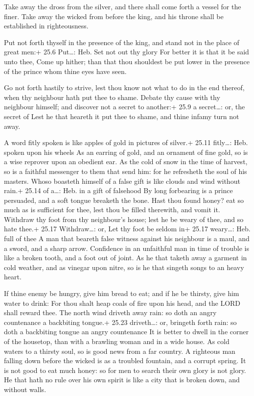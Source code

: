  Take away the dross from the silver, and there shall come
forth a vessel for the finer.  Take away the wicked from
before the king, and his throne shall be established in righteousness.

 Put not forth thyself in the presence of the king, and
stand not in the place of great men:+ 25.6 Put\ldots: Heb. Set not out
thy glory  For better it is that it be said unto thee, Come
up hither; than that thou shouldest be put lower in the presence of the
prince whom thine eyes have seen.

 Go not forth hastily to strive, lest thou know not what to
do in the end thereof, when thy neighbour hath put thee to shame.
 Debate thy cause with thy neighbour himself; and discover
not a secret to another:+ 25.9 a secret\ldots: or, the secret of
 Lest he that heareth it put thee to shame, and thine
infamy turn not away.

 A word fitly spoken is like apples of gold in pictures of
silver.+ 25.11 fitly\ldots: Heb. spoken upon his wheels  As
an earring of gold, and an ornament of fine gold, so is a wise reprover
upon an obedient ear.  As the cold of snow in the time of
harvest, so is a faithful messenger to them that send him: for he
refresheth the soul of his masters.  Whoso boasteth himself
of a false gift is like clouds and wind without rain.+ 25.14 of a\ldots:
Heb. in a gift of falsehood  By long forbearing is a prince
persuaded, and a soft tongue breaketh the bone.  Hast thou
found honey? eat so much as is sufficient for thee, lest thou be filled
therewith, and vomit it.  Withdraw thy foot from thy
neighbour's house; lest he be weary of thee, and so hate thee.+ 25.17
Withdraw\ldots: or, Let thy foot be seldom in+ 25.17 weary\ldots: Heb.
full of thee  A man that beareth false witness against his
neighbour is a maul, and a sword, and a sharp arrow. 
Confidence in an unfaithful man in time of trouble is like a broken
tooth, and a foot out of joint.  As he that taketh away a
garment in cold weather, and as vinegar upon nitre, so is he that
singeth songs to an heavy heart.

 If thine enemy be hungry, give him bread to eat; and if he
be thirsty, give him water to drink:  For thou shalt heap
coals of fire upon his head, and the LORD shall reward thee.
 The north wind driveth away rain: so doth an angry
countenance a backbiting tongue.+ 25.23 driveth\ldots: or, bringeth
forth rain: so doth a backbiting tongue an angry countenance
 It is better to dwell in the corner of the housetop, than
with a brawling woman and in a wide house.  As cold waters
to a thirsty soul, so is good news from a far country.  A
righteous man falling down before the wicked is as a troubled fountain,
and a corrupt spring.  It is not good to eat much honey: so
for men to search their own glory is not glory.  He that
hath no rule over his own spirit is like a city that is broken down, and
without walls.


